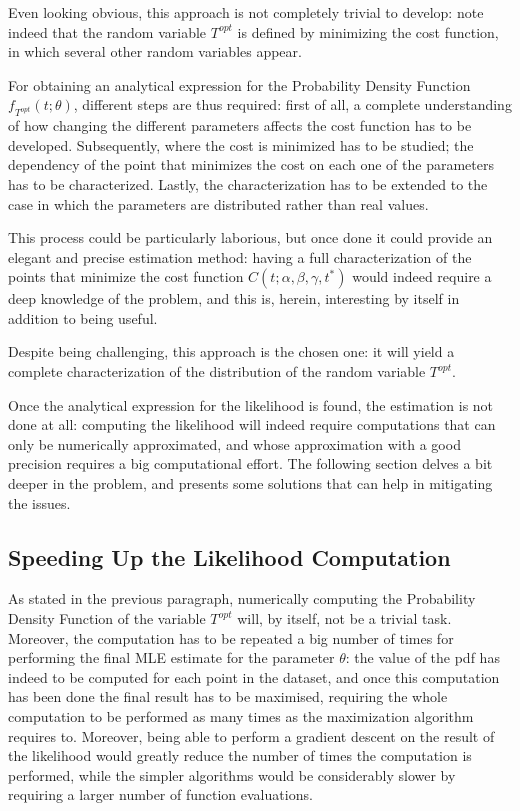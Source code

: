 Even looking obvious, this approach is not completely trivial to develop:
note indeed that the random variable \(T^{opt}\) is defined by minimizing the cost function,
in which several other random variables appear.

For obtaining an analytical expression for the Probability Density Function \(f_{T^{opt}}(t; \theta)\), different steps are thus required:
first of all, a complete understanding of how changing the different parameters affects the cost function has to be developed.
Subsequently, where the cost is minimized has to be studied;
the dependency of the point that minimizes the cost on each one of the parameters has to be characterized.
Lastly, the characterization has to be extended to the case in which the parameters are distributed rather than real values.

This process could be particularly laborious,
but once done it could provide an elegant and precise estimation method:
having a full characterization of the points that minimize the cost function \(C(t; \alpha, \beta, \gamma, t^*)\) would indeed require a deep knowledge of the problem,
and this is, herein, interesting by itself in addition to being useful.

Despite being challenging,
this approach is the chosen one:
it will yield a complete characterization of the distribution of the random variable \(T^{opt}\).

Once the analytical expression for the likelihood is found,
the estimation is not done at all:
computing the likelihood will indeed require computations that can only be numerically approximated,
and whose approximation with a good precision requires a big computational effort.
The following section delves a bit deeper in the problem,
and presents some solutions that can help in mitigating the issues.

\subsection{Speeding Up the Likelihood Computation}
\label{sec:lik_speed}
As stated in the previous paragraph, numerically computing the Probability Density Function of the variable \(T^{opt}\) will,
by itself, not be a trivial task.
Moreover, the computation has to be repeated a big number of times for performing the final MLE estimate for the parameter \(\theta\):
the value of the pdf has indeed to be computed for each point in the dataset,
and once this computation has been done the final result has to be maximised,
requiring the whole computation to be performed as many times as the maximization algorithm requires to.
Moreover, being able to perform a gradient descent on the result of the likelihood would greatly reduce the number of times the computation is performed,
while the simpler algorithms would be considerably slower by requiring a larger number of function evaluations.

